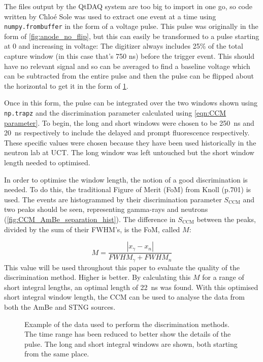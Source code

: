 \documentclass[11pt]{article}
\numberwithin{equation}{section}
\numberwithin{figure}{section}
\numberwithin{table}{section}
\begin{document}
\par The files output by the QtDAQ system are too big to import in one go, so code written by Chlo\'e Sole was used to extract one event at a time using \texttt{numpy.frombuffer} in the form of a voltage pulse. This pulse was originally in the form of \cref{fig:anode_no_flip}, but this can easily be transformed to a pulse starting at 0 and increasing in voltage: The digitizer always includes 25\% of the total capture window (in this case that's 750 ns) before the trigger event. This should have no relevant signal and so can be averaged to find a baseline voltage which can be subtracted from the entire pulse and then the pulse can be flipped about the horizontal to get it in the form of \cref{fig:anode_flipped}.
\par Once in this form, the pulse can be integrated over the two windows shown using \texttt{np.trapz} and the discrimination parameter calculated using \cref{eqn:CCM parameter}. To begin, the long and short windows were chosen to be \SI{250}{\nano\second} and \SI{20}{\nano\second} respectively to include the delayed and prompt fluorescence respectively. These specific values were chosen because they have been used historically in the neutron lab at UCT. The long window was left untouched but the short window length needed to optimised.

\par In order to optimise the window length, the notion of a good discrimination is needed. To do this, the traditional Figure of Merit (FoM) from Knoll (p.701) is used. The events are histogrammed by their discrimination parameter $S_{\mathrm{CCM}}$ and two peaks should be seen, representing gamma-rays and neutrons (\cref{fig:CCM_AmBe_separation_hist}). The difference in $S_{\mathrm{CCM}}$ between the peaks, divided by the sum of their FWHM's, is the FoM, called $M$:

\begin{equation}
    M = \frac{|x_\gamma-x_n|}{FWHM_\gamma + FWHM_n}
    \label{eqn:Figure of Merit}
\end{equation}
This value will be used throughout this paper to evaluate the quality of the discrimination method. Higher is better. By calculating this $M$ for a range of short integral lengths, an optimal length of \SI{22}{\nano\second} was found. With this optimised short integral window length, the CCM can be used to analyse the data from both the AmBe and STNG sources. 

\begin{figure}
    \caption{Example of the data used to perform the discrimination methods. The time range has been reduced to better show the details of the pulse. The long and short integral windows are shown, both starting from the same place. }
    \label{fig:anode_flipped}
\end{figure}
\end{document}
